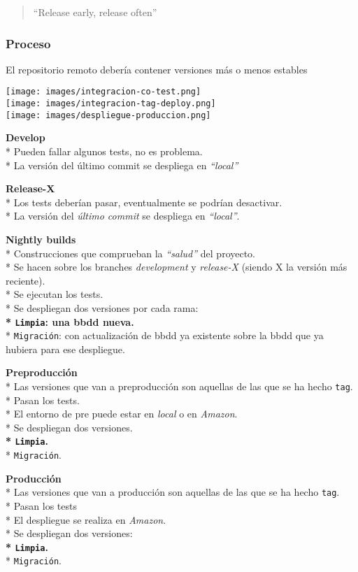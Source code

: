 \begin{quote}
``Release early, release often''

\end{quote}
\subsubsection{Proceso}

El repositorio remoto debería contener versiones más o menos estables

\texttt{[image: images/integracion-co-test.png]}\\\texttt{[image: images/integracion-tag-deploy.png]}\\\texttt{[image: images/despliegue-produccion.png]}

\textbf{Develop}\\* Pueden fallar algunos tests, no es problema.\\* La
versión del último commit se despliega en \emph{``local''}

\textbf{Release-X}\\* Los tests deberían pasar, eventualmente se podrían
desactivar.\\* La versión del \emph{último commit} se despliega en
\emph{``local''}.

\textbf{Nightly builds}\\* Construcciones que comprueban la
\emph{``salud''} del proyecto.\\* Se hacen sobre los branches
\emph{development} y \emph{release-X} (siendo X la versión más
reciente).\\* Se ejecutan los tests.\\* Se despliegan dos versiones por
cada rama:\\\textbf{* \texttt{Limpia}: una bbdd nueva.\\}*
\texttt{Migración}: con actualización de bbdd ya existente sobre la bbdd
que ya hubiera para ese despliegue.

\textbf{Preproducción}\\* Las versiones que van a preproducción son
aquellas de las que se ha hecho \texttt{tag}.\\* Pasan los tests.\\* El
entorno de pre puede estar en \emph{local} o en \emph{Amazon}.\\* Se
despliegan dos versiones.\\\textbf{* \texttt{Limpia}.\\}*
\texttt{Migración}.

\textbf{Producción}\\* Las versiones que van a producción son aquellas
de las que se ha hecho \texttt{tag}.\\* Pasan los tests\\* El despliegue
se realiza en \emph{Amazon}.\\* Se despliegan dos versiones:\\\textbf{*
\texttt{Limpia}.\\}* \texttt{Migración}.

